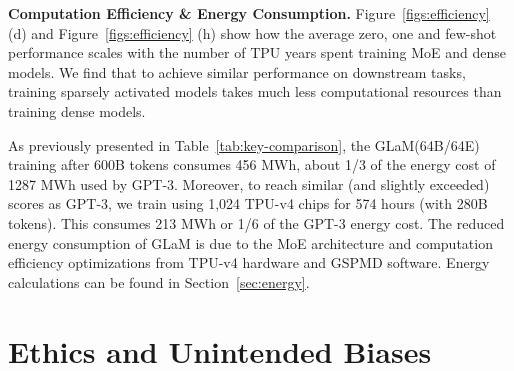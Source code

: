 \documentclass{article}
\newcommand{\glam}{GLaM\xspace}
\begin{document}
\textbf{Computation Efficiency \& Energy Consumption.}
Figure~\ref{figs:efficiency} (d) and Figure~\ref{figs:efficiency} (h) show how the average zero, one and few-shot performance scales with the number of TPU years spent training MoE and dense models. We find that to achieve similar performance on downstream tasks, training sparsely activated models takes much less computational resources than training dense models.


As previously presented in Table~\ref{tab:key-comparison}, the \glam (64B/64E) training after 600B tokens consumes 456 MWh, about 1/3 of the energy cost of 1287 MWh used by GPT-3. Moreover, to reach similar (and slightly exceeded) scores as GPT-3, we train using 1,024 TPU-v4 chips for 574 hours (with 280B tokens). This consumes 213 MWh or 1/6 of the GPT-3 energy cost.  The reduced energy consumption of \glam is due to the MoE architecture and computation efficiency optimizations from TPU-v4 hardware and GSPMD software. Energy calculations can be found in Section~\ref{sec:energy}.













\section{Ethics and Unintended Biases}
\label{sec:rai}
\end{document}
